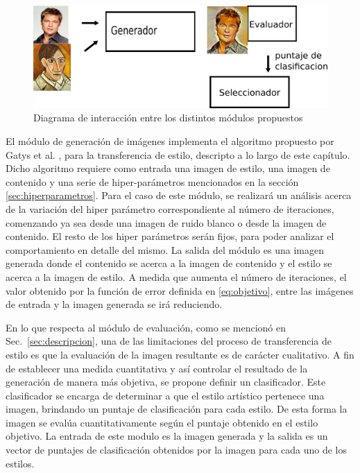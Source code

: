 \documentclass[a4paper,11pt,spanish]{book}
\begin{document}
      \begin{figure}[h]
	\begin{center}
	  \includegraphics[width=\linewidth]{./img/diagrama.png}
	\end{center}
	\caption{Diagrama de interacción entre los distintos módulos propuestos}
	\label{fig:diagrama}
      \end{figure}

      
      El módulo de generación de imágenes implementa el algoritmo propuesto por Gatys et al. \cite{Gatys:Neural_Style}, para la transferencia de estilo, descripto a lo largo 
      de este capítulo. 
      Dicho algoritmo requiere como entrada una imagen de estilo, una imagen de contenido y una serie de hiper-parámetros mencionados en la sección \ref{sec:hiperparametros}.
      Para el caso de este módulo, se realizará un análisis acerca de la variación del hiper parámetro correspondiente al número de iteraciones, comenzando ya sea desde una imagen
      de ruido blanco o desde la imagen de contenido. El resto de los hiper parámetros serán fijos, para poder analizar el comportamiento en detalle del mismo.
      La salida del módulo es una imagen generada donde el contenido se acerca a la imagen de contenido y el estilo se acerca a la imagen de estilo. 
      A medida que aumenta el número de iteraciones, el valor obtenido por la función de error definida en \eqref{eq:objetivo}, entre las imágenes de entrada y la imagen 
      generada se irá reduciendo. 

      En lo que respecta al módulo de evaluación, como se mencionó en Sec.~\ref{sec:descripcion}, una de las limitaciones del proceso de transferencia de estilo 
      es que la evaluación de la imagen resultante es de carácter cualitativo.
      A fin de establecer una medida cuantitativa y así controlar el resultado de la generación de manera más objetiva, se propone definir un clasificador. 
      Este clasificador se encarga de determinar a que el estilo artístico pertenece una imagen, brindando un puntaje  de clasificación para cada estilo.
      De esta forma la imagen se evalúa cuantitativamente según el puntaje obtenido en el estilo objetivo.
      La entrada de este modulo es la imagen generada y la salida es un vector de puntajes de clasificación obtenidos por la imagen para cada uno de los estilos.
\end{document}
